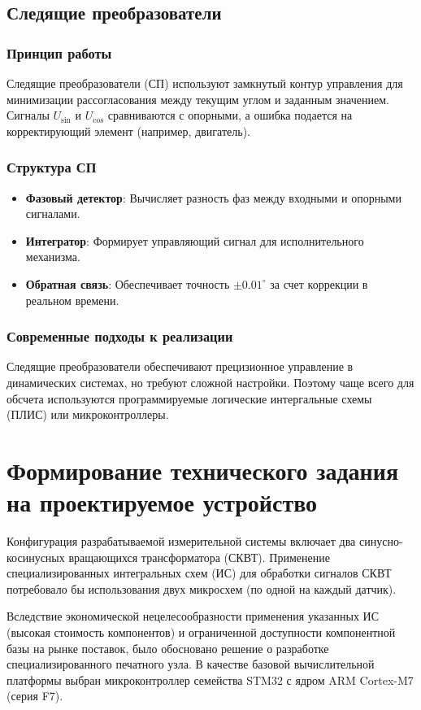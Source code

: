 \subsection{Следящие преобразователи}
\subsubsection{Принцип работы}
Следящие преобразователи (СП) используют замкнутый контур управления для минимизации рассогласования между текущим углом и заданным значением. 
Сигналы \(U_{\sin}\) и \(U_{\cos}\) сравниваются с опорными, а ошибка подается на корректирующий элемент (например, двигатель). \cite{Anufriev2014} \cite{Safronov}

\subsubsection{Структура СП}
\begin{itemize}
    \item \textbf{Фазовый детектор}: Вычисляет разность фаз между входными и опорными сигналами.
    \item \textbf{Интегратор}: Формирует управляющий сигнал для исполнительного механизма.
    \item \textbf{Обратная связь}: Обеспечивает точность \(\pm0.01^\circ\) за счет коррекции в реальном времени.
\end{itemize}

\subsubsection{Современные подходы к реализации}
Следящие преобразователи обеспечивают прецизионное управление в динамических системах, но требуют сложной настройки.
Поэтому чаще всего для обсчета используются программируемые логические интергальные схемы (ПЛИС) или микроконтроллеры.\cite{MilandrSKVT}

\section{Формирование технического задания на проектируемое устройство}

Конфигурация разрабатываемой измерительной системы включает два синусно-косинусных вращающихся трансформатора (СКВТ). 
Применение специализированных интегральных схем (ИС) для обработки сигналов СКВТ потребовало бы использования двух микросхем (по одной на каждый датчик). 

Вследствие экономической нецелесообразности применения указанных ИС (высокая стоимость компонентов) и ограниченной доступности компонентной базы 
на рынке поставок, было обосновано решение о разработке специализированного печатного узла. В качестве базовой вычислительной платформы выбран микроконтроллер 
семейства STM32 с ядром ARM Cortex-M7 (серия F7).

